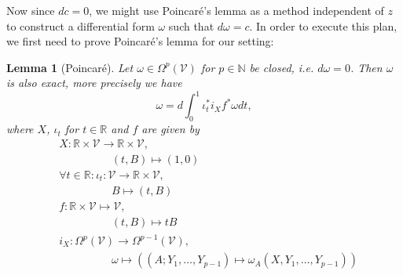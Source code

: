 \documentclass[b5paper,draft,openbib,12pt]{memoir}
\newtheorem{Lemma}[Def]{Lemma}
\begin{document}
Now since \(d c=0\), we might use Poincaré's lemma as a method independent of \(z\) to construct a differential form \(\omega\) such that \(d\omega=c\). 
In order to execute this plan, we first need to prove Poincaré's lemma for our setting:

\begin{Lemma}[Poincaré]\label{lem poincare}
Let \(\omega\in \Omega^p(\mathcal{V})\) for 
\(p\in\mathbb{N}\) be closed, i.e. \(d \omega =0\). 
Then \(\omega\) is also exact, more precisely we have
\begin{equation}
\omega=d \int_{0}^1 \iota^*_t i_X f^* \omega dt,
\end{equation}
where \(X\), \(\iota_t\) for \(t\in\mathbb{R}\) and \(f\) are given by
 \begin{align}
 &X: \mathbb{R}\times\mathcal{V}\rightarrow \mathbb{R}\times\mathcal{V},\\
 &\hspace{2cm} (t,B)\mapsto (1,0) \\
&\forall t \in \mathbb{R}: \iota_t: \mathcal{V}\rightarrow \mathbb{R}\times\mathcal{V},\\
&\hspace{2cm} B\mapsto (t,B)\\
&f:\mathbb{R}\times \mathcal{V}\mapsto \mathcal{V},\\
&\hspace{2cm} (t,B) \mapsto t B\\
&i_X: \Omega^p(\mathcal{V})\rightarrow \Omega^{p-1}(\mathcal{V}),\\
&\hspace{2cm} \omega \mapsto ((A;Y_1,\dots, Y_{p-1})\mapsto \omega_A(X,Y_1,\dots,Y_{p-1}))
 \end{align}
\end{Lemma}
\end{document}
